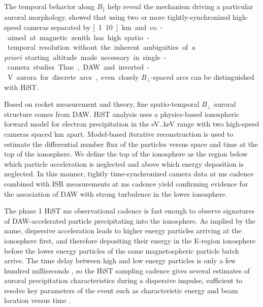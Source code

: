 The temporal behavior along $B_\parallel$ help reveal the mechanism driving a particular auroral morphology.
\citet{hirsch2016} showed that using two or more tightly-synchronized high-speed cameras separated by \unit[1..10]{km} and co-aimed at magnetic zenith has high spatio-temporal resolution without the inherent ambiguities of \textit{a priori} starting altitude made necessary in single-camera studies.
Thus, DAW and inverted-V aurora for discrete arcs, even closely $B_\perp$-spaced arcs can be distinguished with HiST.

Based on rocket measurement and theory, fine spatio-temporal $B_\perp$ auroral structure comes from DAW.
HiST analysis uses a physics-based ionospheric forward model for electron precipitation in the \unit[50]{eV}..\unit[18]{keV} range with two high-speed cameras spaced \unit[3]{km} apart.
Model-based iterative reconstruction is used to estimate the differential number flux of the particles versus space and time at the top of the ionosphere.
We define the top of the ionosphere as the region below which particle acceleration is neglected and above which energy deposition is neglected.
In this manner, tightly time-synchronized camera data at \unit[30]{ms} cadence combined with ISR measurements at \unit[100]{ms} cadence yield confirming evidence for the association of DAW with strong turbulence in the lower ionosphere.

The phase 1 HiST \unit[30]{ms} observational cadence is fast enough \citep{peticolas2000,hirsch2016} to observe signatures of DAW-accelerated particle precipitating into the ionosphere.
As implied by the name, dispersive acceleration leads to higher energy particles arriving at the ionosphere first, and therefore depositing their energy in the E-region ionosphere before the lower energy particles of the same magnetospheric particle batch arrive.
The time delay between high and low energy particles is only a few hundred milliseconds \citep{dahlgren2013}, so the HiST sampling cadence gives several estimates of auroral precipitation characteristics during a dispersive impulse, sufficient to resolve key parameters of the event such as characteristic energy and beam location versus time \citep{histfeas}.
